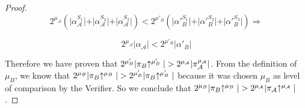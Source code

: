 \begin{proof}
\begin{equation*}
	2^{\mu_\mathcal{A}} ( \vert \alpha_\mathcal{A}^{S_1} \vert + \vert \alpha_\mathcal{A}^{S_2} \vert + \vert \alpha_\mathcal{A}^{S_3} \vert ) < 2^{\mu'_B} ( \vert \alpha'{_B^{S_1}} \vert + \vert \alpha'{_B^{S_2}} \vert + \vert \alpha'{_B^{S_3}} \vert) \Rightarrow
\end{equation*}

\begin{equation} \label{eq_v_all_round_sets}
	2^{\mu_\mathcal{A}} \vert \alpha_\mathcal{A} \vert < 2^{\mu'_B} \vert \alpha'{_B} \vert
\end{equation}

Therefore we have proven that $2^{\mu'_B} \vert \pi_B \negthickspace\uparrow^{\mu'_B} \vert > 2^{\mu_\mathcal{A}} \vert \pi_\mathcal{A}^{\mu_\mathcal{A}} \vert$. From the definition of $\mu_B$, we know that $2^{\mu_B} \vert \pi_B \negthickspace\uparrow^{\mu_B} \vert > 2^{\mu'_B} \vert \pi_B \negthickspace\uparrow^{\mu'_B} \vert$ because it was chosen $\mu_B$ as level of comparison by the Verifier. So we conclude that $2^{\mu_B} \vert \pi_B \negthickspace\uparrow^{\mu_B} \vert > 2^{\mu_\mathcal{A}} \vert \pi_\mathcal{A} \negthickspace\uparrow^{\mu_\mathcal{A}} \vert$.
\end{proof}
